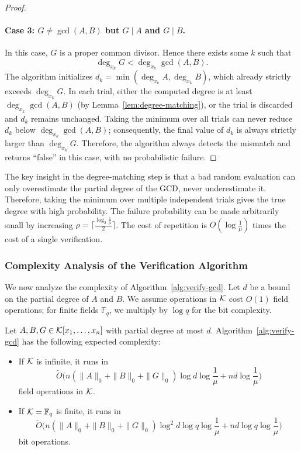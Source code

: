 \documentclass{article}
\numberwithin{equation}{section}
\begin{document}
\begin{proof}
\paragraph{Case 3: $G \neq \gcd(A, B)$ but $G \mid A$ and $G \mid B$.}
In this case, $G$ is a proper common divisor. Hence there exists some $k$ such that
\[
\deg_{x_k} G < \deg_{x_k} \gcd(A,B).
\]
The algorithm initializes $d_k = \min(\deg_{x_k} A, \deg_{x_k} B)$, which already strictly exceeds $\deg_{x_k} G$. In each trial, either the computed degree is at least $\deg_{x_k} \gcd(A,B)$ (by Lemma~\ref{lem:degree-matching}), or the trial is discarded and $d_k$ remains unchanged. Taking the minimum over all trials can never reduce $d_k$ below $\deg_{x_k} \gcd(A,B)$; consequently, the final value of $d_k$ is always strictly larger than $\deg_{x_k} G$. Therefore, the algorithm always detects the mismatch and returns ``false'' in this case, with no probabilistic failure.
%
\end{proof}

\begin{remark}
The key insight in the degree-matching step is that a bad random evaluation can only overestimate the partial degree of the GCD, never underestimate it. Therefore, taking the minimum over multiple independent trials gives the true degree with high probability.
%
The failure probability can be made arbitrarily small by increasing $\rho = \lceil \frac{\log_2\frac{1}{\mu}}{2} \rceil$. The cost of repetition is $O(\log\frac{1}{\mu})$ times the cost of a single verification.
\end{remark}





\subsubsection*{Complexity Analysis of the Verification Algorithm}

We now analyze the complexity of Algorithm~\ref{alg:verify-gcd}. Let $d$ be a bound on the partial degree of $A$ and $B$. We assume operations in ${\mathcal{K}}$ cost $O(1)$ field operations; for finite fields $\mathbb{F}_q$, we multiply by $\log q$ for the bit complexity.

\begin{theorem}\label{thm-veri-comple}
Let $A, B, G \in {\mathcal{K}}[x_1,\dots,x_n]$ with partial degree at most $d$. Algorithm~\ref{alg:verify-gcd} has the following expected complexity:

\begin{itemize}
    \item If ${\mathcal{K}}$ is infinite, it runs in
    \[
    \widetilde{O}\bigl( n (\|A\|_0 + \|B\|_0 + \|G\|_0) \log d \log\frac{1}{\mu} + n d \log\frac{1}{\mu} \bigr)
    \]
    field operations in ${\mathcal{K}}$.

    \item If ${\mathcal{K}} = \mathbb{F}_q$ is finite, it runs in
    \[
    \widetilde{O}\bigl( n (\|A\|_0 + \|B\|_0 + \|G\|_0) \log^2 d \log q \log\frac{1}{\mu} + n d \log q \log\frac{1}{\mu} \bigr)
    \]
    bit operations.
\end{itemize}
\end{theorem}
\end{document}
